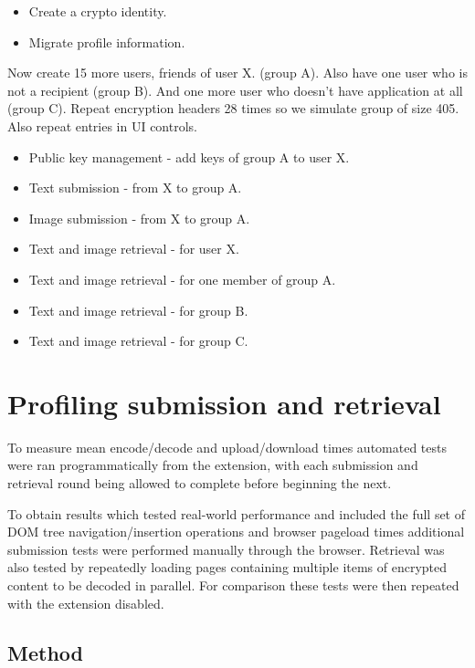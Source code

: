 \begin{itemize}
    \item Create a crypto identity.
    \item Migrate profile information.
\end{itemize}

Now create 15 more users, friends of user X. (group A). Also have one user who is not a recipient (group B). And one more user who doesn't have application at all (group C). Repeat encryption headers 28 times so we simulate group of size 405. Also repeat entries in UI controls.

\begin{itemize}
    \item Public key management - add keys of group A to user X.
    \item Text submission - from X to group A.
    \item Image submission - from X to group A.
    \item Text and image retrieval - for user X.
    \item Text and image retrieval - for one member of group A.
    \item Text and image retrieval - for group B.
    \item Text and image retrieval - for group C.
\end{itemize}

\section{Profiling submission and retrieval}

To measure mean encode/decode and upload/download times automated tests were ran programmatically from the extension, with each submission and retrieval round being allowed to complete before beginning the next.

To obtain results which tested real-world performance and included the full set of DOM tree navigation/insertion operations and browser pageload times additional submission tests were performed manually through the browser. Retrieval was also tested by repeatedly loading pages containing multiple items of encrypted content to be decoded in parallel. For comparison these tests were then repeated with the extension disabled.

\subsection{Method}

